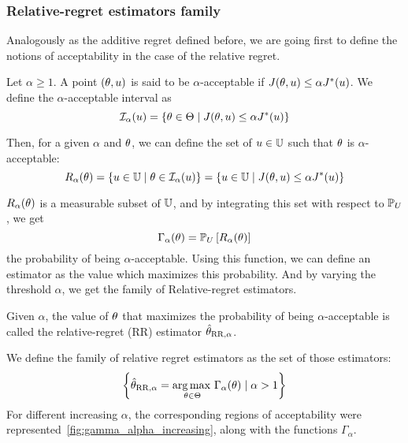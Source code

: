 \documentclass[../../Main_ManuscritThese.tex]{subfiles}
\begin{document}
\subsubsection{Relative-regret estimators family}
Analogously as the additive regret defined before, we are going first to define the notions of acceptability in the case of the relative regret.
\begin{definition}
  Let $\alpha\geq 1$.
  A point $(\theta, u)$ is said to be $\alpha$-acceptable if $J(\theta, u) \leq \alpha J^*(u)$.
  We define the $\alpha$-acceptable interval as
  \begin{equation}
    \mathcal{I}_{\alpha}(u) = \left\{\theta \in \Theta \mid J(\theta,u) \leq \alpha J^*(u) \right\}
  \end{equation}

Then, for a given $\alpha$ and $\theta$, we can define the set of $u\in \mathbb{U}$ such that $\theta$ is $\alpha$-acceptable:
\begin{equation}
  R_{\alpha}(\theta) = \left\{u \in \mathbb{U} \mid \theta \in \mathcal{I}_{\alpha}(u) \right\} = \left\{u \in \mathbb{U} \mid  J(\theta, u) \leq \alpha J^*(u) \right\}
\end{equation}
\end{definition}
$R_{\alpha}(\theta)$ is a measurable subset of $\mathbb{U}$, and by integrating this set with respect to $\mathbb{P}_U$, we get
\begin{equation}
\Gamma_{\alpha}(\theta) = \mathbb{P}_{U}\left[R_\alpha(\theta)\right]
\end{equation}
the probability of being $\alpha$-acceptable. Using this function, we can define an estimator as the value which maximizes this probability. And by varying the threshold $\alpha$, we get the family of Relative-regret estimators.


\begin{definition}
  Given $\alpha$, the value of $\theta$ that maximizes the probability of being $\alpha$-acceptable is called the relative-regret (RR) estimator $\hat{\theta}_{\mathrm{RR},\alpha}$.
  
We define the family of relative regret estimators as the set of those estimators:
\begin{equation}
      \left\{\hat{\theta}_{\mathrm{RR,\alpha}} = \operatorname*{arg\,max \,}_{\theta\in\Theta} \Gamma_{\alpha}(\theta)\mid \alpha > 1\right\}
    \end{equation}
    For different increasing $\alpha$, the corresponding regions of acceptability were represented~\cref{fig:gamma_alpha_increasing}, along with the functions $\Gamma_{\alpha}$.
  \end{definition}
\end{document}
